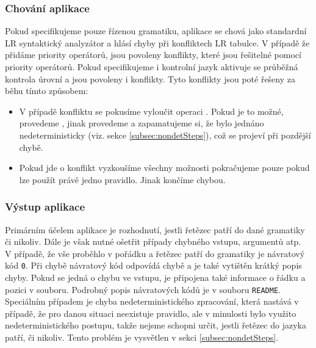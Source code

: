 \subsubsection*{Chování aplikace}

Pokud specifikujeme pouze řízenou gramatiku, aplikace se chová jako
standardní LR syntaktický analyzátor a hlásí chyby při konfliktech LR tabulce.
V případě že přidáme priority operátorů, jsou povoleny 
konflikty, které jsou řešitelné pomocí priority operátorů.
Pokud specifikujeme i kontrolní jazyk aktivuje se
průběžná kontrola úrovní a jsou povoleny  i
 konflikty. Tyto konflikty jsou poté
řešeny za běhu tímto způsobem:

\begin{itemize}
  \item V případě  konfliktu se pokusíme vyloučit operaci
    . Pokud je to možné, provedeme , jinak
    provedeme  a zapamatujeme si, že bylo jednáno
    nedeterministicky (viz. sekce \ref{subsec:nondetSteps}), což se projeví při pozdější chybě.
  \item Pokud jde o  konflikt vyzkoušíme všechny možnosti
    pokračujeme pouze pokud lze použít právě jedno pravidlo. Jinak končíme
    chybou.
\end{itemize}

\subsubsection*{Výstup aplikace}

Primárním účelem aplikace je rozhodnutí, jestli řetězec patří do dané
gramatiky či nikoliv. Dále je však nutné ošetřit případy chybného vstupu,
argumentů atp.\\

V případě, že vše proběhlo v pořádku a řetězec patří do gramatiky je návratový
kód \texttt{0}. Při chybě návratový kód odpovídá chybě a je také vytištěn krátký
popis chyby. Pokud se jedná o chybu ve vstupu, je připojena také informace o
řádku a pozici v souboru. Podrobný popis návratových kódů je v souboru \texttt{README}.\\

Speciálním případem je chyba nedeterministického zpracování, která nastává
v případě, že pro danou situaci neexistuje pravidlo, ale v minulosti
bylo využito nedeterministického postupu, takže nejsme schopni určit, jestli
řetězec do jazyka patří, či nikoliv. Tento problém je vysvětlen v sekci
\ref{subsec:nondetSteps}.

